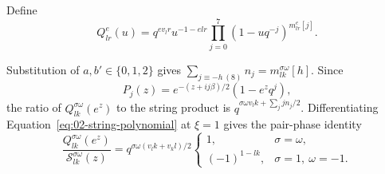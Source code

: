 Define
\begin{equation}\label{eq:02-Q}
 Q^e_{lr}(u)=q^{ev_lr}u^{-1-elr}
       \prod_{j=0}^7(1-uq^{-j})^{m^e_{lr}[j]}.
\end{equation}

Substitution of $a,b'\in\{0,1,2\}$ gives
$\sum_{j\equiv-h\ (8)}n_j=m^{\sigma\omega}_{lk}[h]$.
Since
\[
 P_j(z)=e^{-(z+ij\beta)/2}(1-e^zq^j),
\]
the ratio of $Q^{\sigma\omega}_{lk}(e^z)$ to the string product is
$q^{\sigma\omega v_lk+\sum_j jn_j/2}$.
Differentiating Equation~\eqref{eq:02-string-polynomial} at $\xi=1$
gives the pair-phase identity
\begin{equation}\label{eq:02-string-phase}
 \frac{Q^{\sigma\omega}_{lk}(e^z)}{\mathcal S^{\sigma\omega}_{lk}(z)}
 =q^{\sigma\omega(v_lk+v_kl)/2}
 \begin{cases}
 1,&\sigma=\omega,\\
 (-1)^{1-lk},&\sigma=1,\ \omega=-1.
 \end{cases}
\end{equation}


